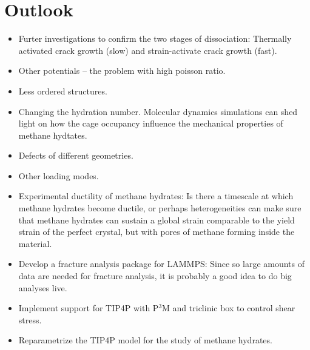 \section{Outlook}
\begin{itemize}
\item Furter investigations to confirm the two stages of dissociation: Thermally activated crack growth (slow) and strain-activate crack growth (fast).
\item Other potentials – the problem with high poisson ratio.
\item Less ordered structures.
\item Changing the hydration number. Molecular dynamics simulations can shed light on how the cage occupancy influence the mechanical properties of methane hydtates.
\item Defects of different geometries.
\item Other loading modes.
\item Experimental ductility of methane hydrates: Is there a timescale at which methane hydrates become ductile, or perhaps heterogeneities can make sure that methane hydrates can sustain a global strain comparable to the yield strain of the perfect crystal, but with pores of methane forming inside the material. 
\item Develop a fracture analysis package for LAMMPS: Since so large amounts of data are needed for fracture analysis, it is probably a good idea to do big analyses live.
\item Implement support for TIP4P with P$^3$M and triclinic box to control shear stress.
\item Reparametrize the TIP4P model for the study of methane hydrates.
\end{itemize}